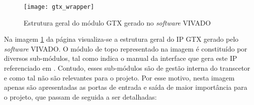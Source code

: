 \begin{figure}[h!]
	\begin{center}
		\leavevmode
		\texttt{[image: gtx\_wrapper]}
		\captionsetup{width=1.0\linewidth}
		\caption[Estrutura geral do módulo GTX  gerado no \textit{software} VIVADO]{Estrutura geral do módulo GTX gerado no \textit{software} VIVADO}
		\label{fig:gtx_wrapper}
	\end{center}
\end{figure}

Na imagem \ref{fig:gtx_wrapper} da página  \pageref{fig:gtx_wrapper} visualiza-se a estrutura geral do IP GTX gerado pelo \textit{software} VIVADO. O módulo de topo representado na imagem é constituído por diversos sub-módulos, tal como indica o manual da interface que gera este IP referenciado em \cite{R022}. Contudo, esses sub-módulos são de gestão interna do transcetor e como tal não são relevantes para o projeto. Por esse motivo, nesta imagem apenas são apresentadas as portas de entrada e saída de maior importância para o projeto, que passam de seguida a ser detalhadas:

